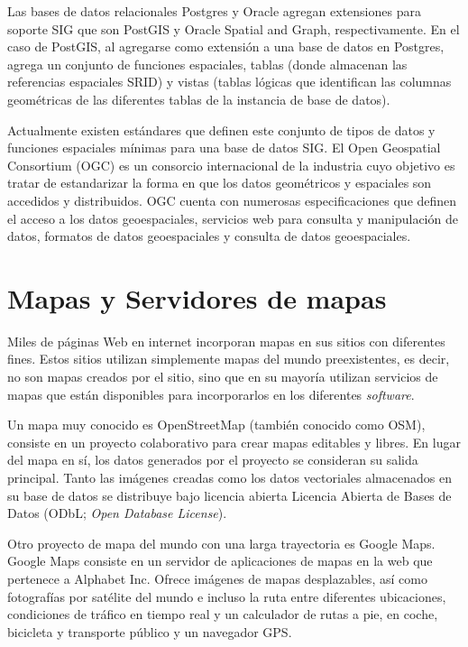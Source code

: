 Las bases de datos relacionales Postgres y Oracle agregan extensiones para soporte SIG que son PostGIS y Oracle Spatial and Graph, respectivamente. En el caso de PostGIS, al agregarse como extensión a una base de datos en Postgres, agrega un conjunto de funciones espaciales, tablas (donde almacenan las referencias espaciales SRID) y vistas (tablas lógicas que identifican las columnas geométricas de las diferentes tablas de la instancia de base de datos).

Actualmente existen estándares que definen este conjunto de tipos de datos y funciones espaciales mínimas para una base de datos SIG. El Open Geospatial Consortium (OGC) es un consorcio internacional de la industria cuyo objetivo es tratar de estandarizar la forma en que los datos geométricos y espaciales son accedidos y distribuidos. OGC cuenta con numerosas especificaciones que definen el acceso a los datos geoespaciales, servicios web para consulta y manipulación de datos, formatos de datos geoespaciales y consulta de datos geoespaciales.

\section{Mapas y Servidores de mapas}

Miles de páginas Web en internet incorporan mapas en sus sitios con diferentes fines. Estos sitios utilizan simplemente mapas del mundo preexistentes, es decir, no son mapas creados por el sitio, sino que en su mayoría utilizan servicios de mapas que están disponibles para incorporarlos en los diferentes \textit{software}.

Un mapa muy conocido es OpenStreetMap (también conocido como OSM), consiste en un proyecto colaborativo para crear mapas editables y libres. En lugar del mapa en sí, los datos generados por el proyecto se consideran su salida principal. Tanto las imágenes creadas como los datos vectoriales almacenados en su base de datos se distribuye bajo licencia abierta Licencia Abierta de Bases de Datos (ODbL; \textit{Open Database License}).

Otro proyecto de mapa del mundo con una larga trayectoria es Google Maps. Google Maps consiste en un servidor de aplicaciones de mapas en la web que pertenece a Alphabet Inc. Ofrece imágenes de mapas desplazables, así como fotografías por satélite del mundo e incluso la ruta entre diferentes ubicaciones, condiciones de tráfico en tiempo real y un calculador de rutas a pie, en coche, bicicleta y transporte público y un navegador GPS.


